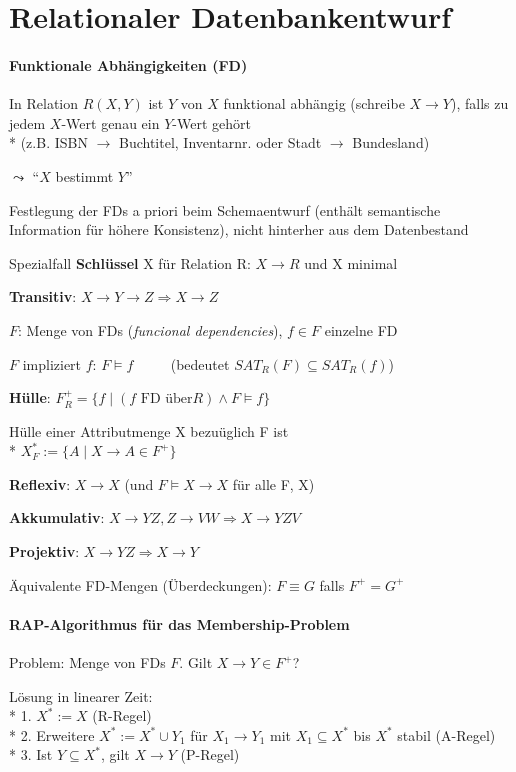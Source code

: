 \section{Relationaler Datenbankentwurf}
\label{sec:abbildenRelational}

\paragraph{Funktionale Abhängigkeiten (FD)}
\begin{items}
	\item In Relation \( R(X,Y) \) ist \( Y \) von \( X \) funktional abhängig (schreibe \( X \to Y \)), falls zu jedem \( X \)-Wert genau ein \( Y \)-Wert gehört \\*
	 (z.B. ISBN $\to$ Buchtitel, Inventarnr. oder Stadt $\to$ Bundesland)
	\item \( \leadsto \) ``\( X \) bestimmt \( Y \)''
	\item Festlegung der FDs a priori beim Schemaentwurf (enthält semantische Information für höhere Konsistenz), nicht hinterher aus dem Datenbestand
	\item Spezialfall \textbf{Schlüssel} X für Relation R: $X \to R$ und X minimal
	\item \textbf{Transitiv}: $X \to  Y  \to  Z \Rightarrow  X  \to Z$
	\item \( F \): Menge von FDs (\emph{funcional dependencies}), \( f \in F \) einzelne FD
	\item \( F \) impliziert \( f \): \( F \models f \)   $\qquad$  (bedeutet $SAT_R(F) \subseteq SAT_R(f)$)
	\item \textbf{Hülle}: \( F_R^+ = \{ f \mid (f \text{ FD über} R) \wedge F \models f \} \)
	\item Hülle einer Attributmenge X bezuüglich F ist \\*
	$X^*_F := \{ A \mid X \to A \in F^+ \}$
	\item \textbf{Reflexiv}: $X \to X$ (und $F \models X \to X$ für alle F, X)
	\item \textbf{Akkumulativ}: $X \to YZ, Z \to VW \Rightarrow X \to YZV$
	\item \textbf{Projektiv}: $X \to YZ \Rightarrow X \to Y$
	\item Äquivalente FD-Mengen (Überdeckungen): \( F \equiv G \) falls \( F^+ = G^+ \)
\end{items}

\paragraph{RAP-Algorithmus für das Membership-Problem}
\begin{items}
	\item  Problem: Menge von FDs $F$. Gilt $X \to Y \in F^+$?
	\item Lösung in linearer Zeit: \\*
		1. $X^* :=  X$ (R-Regel) \\*
		2. Erweitere $X^* := X^* \cup Y_1$ für $X_1 \to Y_1$ mit $X_1 \subseteq X^*$ bis $X^*$ stabil (A-Regel) \\*
		3. Ist $Y \subseteq X^*$, gilt $X \to Y$ (P-Regel)
\end{items}

